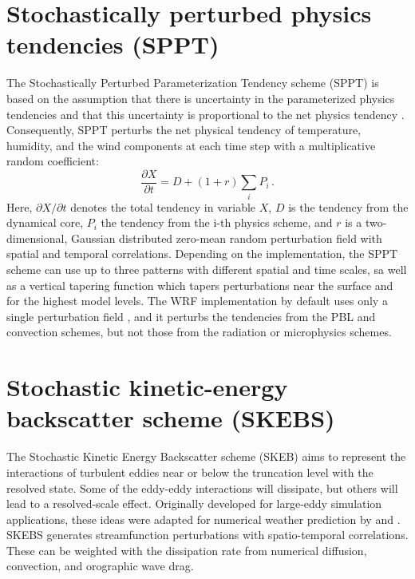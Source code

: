 \section {Stochastically perturbed physics tendencies (SPPT)}
The Stochastically Perturbed Parameterization Tendency scheme
(SPPT) is based on the assumption that there is uncertainty
in the parameterized physics tendencies and that this 
uncertainty is proportional to the net physics tendency \citep{Bu99,Pa09}.
Consequently, SPPT perturbs the net physical tendency of temperature, 
humidity, and the wind components at each time step with a multiplicative 
random coefficient:
\begin{equation}
   \frac{\partial X}{\partial t}= D + (1+ r) \sum_i P_i \,.
\end{equation}
Here, ${\partial X}/{\partial t}$ denotes the total tendency in variable $X$, 
$D$ is the tendency from the dynamical core, 
$P_i$ the tendency from the i-th physics scheme, 
and $r$ is a two-dimensional, Gaussian distributed zero-mean random
perturbation field with spatial and temporal correlations. 
Depending on
the implementation, the SPPT scheme can use up to three patterns with
different spatial and time scales, sa well as a vertical tapering function which 
tapers perturbations near the surface and for the highest model levels.
The WRF implementation by default uses only a single perturbation field \citep{Be15},
and it perturbs the tendencies from the PBL and convection schemes, but not those from 
the radiation or microphysics schemes.

\section{Stochastic kinetic-energy backscatter scheme (SKEBS)}
The Stochastic Kinetic Energy Backscatter scheme (SKEB) aims to represent
the interactions of turbulent eddies near or below the
truncation level with the resolved state. Some of the eddy-eddy interactions
will dissipate, but others will lead to a resolved-scale effect.
Originally developed for large-eddy simulation applications, these ideas were 
adapted for numerical weather prediction by
\citet{Sh05} and \citet{Be09}.
SKEBS generates streamfunction perturbations with spatio-temporal correlations. These
can be weighted with the dissipation rate from numerical diffusion, 
convection, and orographic wave drag. 

